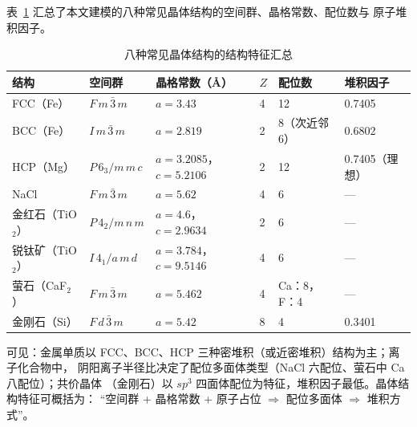 表~\ref{tab:summary} 汇总了本文建模的八种常见晶体结构的空间群、晶格常数、配位数与
原子堆积因子。

\begin{table}[H]
  \centering
  \small
  \caption{八种常见晶体结构的结构特征汇总}
  \label{tab:summary}
  \begin{tabular}{@{}llllll@{}}
    \toprule
    结构 & 空间群 & 晶格常数（\AA） & $Z$ & 配位数 & 堆积因子 \\
    \midrule
    FCC（Fe） & $F\,m\,\bar3\,m$ & $a=3.43$ & 4 & 12 & 0.7405 \\
    BCC（Fe） & $I\,m\,\bar3\,m$ & $a=2.819$ & 2 & 8（次近邻 6） & 0.6802 \\
    HCP（Mg） & $P\,6_3/m\,m\,c$ & $a=3.2085$，$c=5.2106$ & 2 & 12 & 0.7405（理想） \\
    NaCl & $F\,m\,\bar3\,m$ & $a=5.62$ & 4 & 6 & — \\
    金红石（TiO$_2$） & $P\,4_2/m\,n\,m$ & $a=4.6$，$c=2.9634$ & 2 & 6 & — \\
    锐钛矿（TiO$_2$） & $I\,4_1/a\,m\,d$ & $a=3.784$，$c=9.5146$ & 4 & 6 & — \\
    萤石（CaF$_2$） & $F\,m\,\bar3\,m$ & $a=5.462$ & 4 & Ca：8，F：4 & — \\
    金刚石（Si） & $F\,d\,\bar3\,m$ & $a=5.42$ & 8 & 4 & 0.3401 \\
    \bottomrule
  \end{tabular}
\end{table}

可见：金属单质以 FCC、BCC、HCP 三种密堆积（或近密堆积）结构为主；离子化合物中，
阴阳离子半径比决定了配位多面体类型（NaCl 六配位、萤石中 Ca 八配位）；共价晶体
（金刚石）以 $sp^3$ 四面体配位为特征，堆积因子最低。晶体结构特征可概括为：
``空间群 + 晶格常数 + 原子占位 $\Rightarrow$ 配位多面体 $\Rightarrow$ 堆积方式''。
